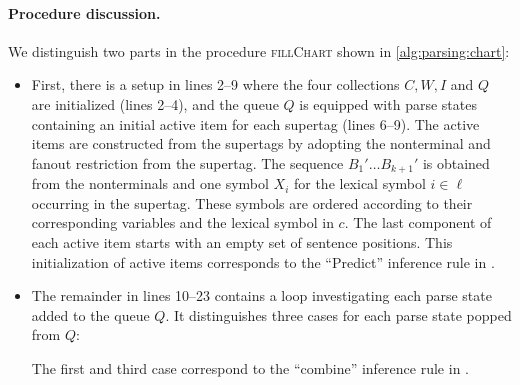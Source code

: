 \documentclass[../../document.tex]{subfiles}
\begin{document}
    \paragraph{Procedure discussion.} We distinguish two parts in the procedure \textsc{fillChart} shown in \cref{alg:parsing:chart}:
    \begin{itemize}
        \item First, there is a setup in lines 2--9 where the four collections \(C, W, I\) and \(Q\) are initialized (lines 2--4), and the queue \(Q\) is equipped with parse states containing an initial active item for each supertag (lines 6--9).
            The active items are constructed from the supertags by adopting the  nonterminal and fanout restriction from the supertag.
            The sequence \(B_1' \ldots B_{k+1}'\) is obtained from the  nonterminals and one symbol \(X_i\) for the lexical symbol \(i \in \ell\) occurring in the supertag.
            These symbols are ordered according to their corresponding variables and the lexical symbol in \(c\).
            The last component of each active item starts with an empty set of sentence positions.
            This initialization of active items corresponds to the ``Predict'' inference rule in .
        \item
            The remainder in lines 10--23 contains a loop investigating each parse state added to the queue \(Q\).
            It distinguishes three cases for each parse state popped from \(Q\):
            The first and third case correspond to the ``combine'' inference rule in .
    \end{itemize}
\end{document}
